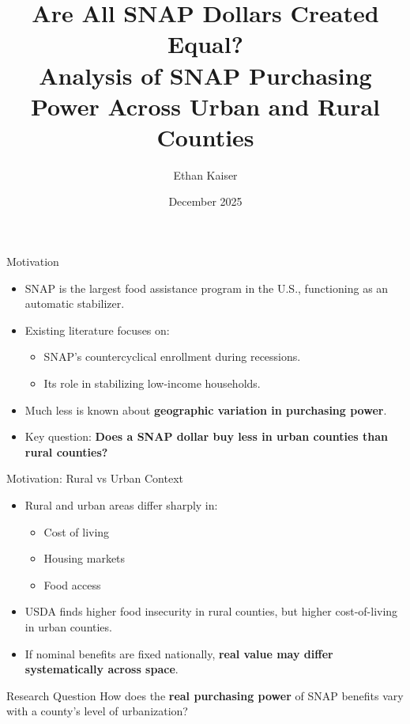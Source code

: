 \documentclass{beamer}
\title[SNAP Purchasing Power]{Are All SNAP Dollars Created Equal?\\
Analysis of SNAP Purchasing Power Across Urban and Rural Counties}
\author{Ethan Kaiser}
\institute{University of South Florida}
\date{December 2025}
\begin{document}
\begin{frame}
\titlepage
\end{frame}

\begin{frame}{Motivation}
\begin{itemize}
    \item SNAP is the largest food assistance program in the U.S., functioning as an automatic stabilizer.
    \item Existing literature focuses on:
    \begin{itemize}
        \item SNAP’s countercyclical enrollment during recessions.
        \item Its role in stabilizing low-income households.
    \end{itemize}
    \item Much less is known about \textbf{geographic variation in purchasing power}.
    \item Key question: \textbf{Does a SNAP dollar buy less in urban counties than rural counties?}
\end{itemize}
\end{frame}

\begin{frame}{Motivation: Rural vs Urban Context}
\begin{itemize}
    \item Rural and urban areas differ sharply in:
    \begin{itemize}
        \item Cost of living
        \item Housing markets
        \item Food access
    \end{itemize}
    \item USDA finds higher food insecurity in rural counties, but higher cost-of-living in urban counties.
    \item If nominal benefits are fixed nationally, \textbf{real value may differ systematically across space}.
\end{itemize}
\end{frame}

\begin{frame}{Research Question}
\centering
\Large
How does the \textbf{real purchasing power} of SNAP benefits vary with a county's level of urbanization?
\end{frame}
\end{document}

